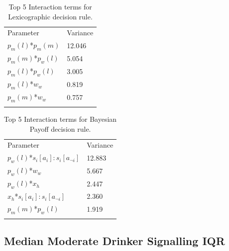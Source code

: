 \documentclass[graybox]{svmult}
\begin{document}
\begin{table}[H]
\caption{Top 5 Interaction terms for Lexicographic decision rule. \label{tab:sa_interaction_lexic_group_iqr}}
\begin{tabular} {ll}
\hline\noalign{\smallskip}
Parameter & Variance \\
\noalign{\smallskip}\svhline\noalign{\smallskip}
\(p_{m}(l)\)*\(p_{m}(m)\) & 12.046\\
\(p_{m}(m)\)*\(p_{w}(l)\) & 5.054\\
\(p_{m}(l)\)*\(p_{w}(l)\) & 3.005\\
\(p_{m}(l)\)*\(w_{w}\) & 0.819\\
\(p_{m}(m)\)*\(w_{w}\) & 0.757\\
\noalign{\smallskip}\hline\noalign{\smallskip}
\end{tabular}
\end{table}

\begin{table}[H]
\caption{Top 5 Interaction terms for Bayesian Payoff decision rule. \label{tab:sa_interaction_payoff_group_iqr}}
\begin{tabular} {ll}
\hline\noalign{\smallskip}
Parameter & Variance \\
\noalign{\smallskip}\svhline\noalign{\smallskip}
\(p_{w}(l)\)*\(s_{i}[a_{i}]:s_{i}[a_{\neg i}]\) & 12.883\\
\(p_{w}(l)\)*\(w_{w}\) & 5.667\\
\(p_{w}(l)\)*\(x_{h}\) & 2.447\\
\(x_{h}\)*\(s_{i}[a_{i}]:s_{i}[a_{\neg i}]\) & 2.360\\
\(p_{m}(m)\)*\(p_{w}(l)\) & 1.919\\ 
\noalign{\smallskip}\hline\noalign{\smallskip}
\end{tabular}
\end{table}

 
\subsection{Median Moderate Drinker Signalling IQR}
\end{document}

